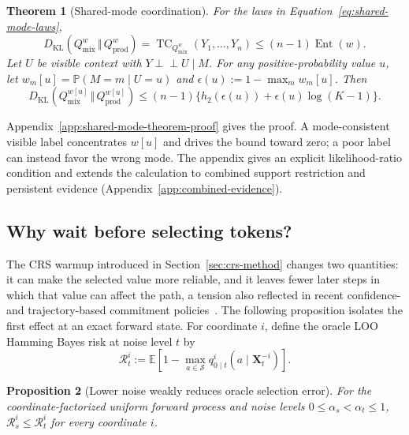 \documentclass{article}
\newcommand{\KL}{D_{\mathrm{KL}}}
\newcommand{\kldiv}{\,\Vert\,}
\newcommand{\TC}{\operatorname{TC}}
\newcommand{\Ent}{\operatorname{Ent}}
\newcommand{\1}{\mathbf 1}
\newtheorem{theorem}{Theorem}
\newtheorem{proposition}[theorem]{Proposition}
\theoremstyle{definition}
\begin{document}
\begin{theorem}[Shared-mode coordination]
\label{thm:shared-mode}
For the laws in Equation~\eqref{eq:shared-mode-laws},
\begin{equation}
 \KL(Q_{\mathrm{mix}}^w\kldiv Q_{\mathrm{prod}}^w)
 =\TC_{Q_{\mathrm{mix}}^w}(Y_1,\ldots,Y_n)
 \le(n-1)\Ent(w).
 \label{eq:shared-mode-gap}
\end{equation}
Let $U$ be visible context with $Y\perp\!\!\!\perp U\mid M$. For any
positive-probability value $u$, let $w_m[u]=\mathbb P(M=m\mid U=u)$ and
$\epsilon(u):=1-\max_m w_m[u]$. Then
\begin{equation}
 \KL(Q_{\mathrm{mix}}^{w[u]}\kldiv Q_{\mathrm{prod}}^{w[u]})
 \le(n-1)\{h_2(\epsilon(u))+\epsilon(u)\log(K-1)\}.
 \label{eq:context-mode-gap}
\end{equation}
\end{theorem}

Appendix~\ref{app:shared-mode-theorem-proof} gives the proof.
A mode-consistent visible label concentrates $w[u]$ and drives the bound
toward zero; a poor label can instead favor the wrong mode. The appendix gives
an explicit likelihood-ratio condition and extends the calculation to combined
support restriction and persistent evidence
(Appendix~\ref{app:combined-evidence}).

\subsection{Why wait before selecting tokens?}

The CRS warmup introduced in Section~\ref{sec:crs-method} changes two
quantities: it can make the selected value more reliable,
and it leaves fewer later steps in which that value can affect the path, a
tension also reflected in recent confidence- and trajectory-based commitment
policies~\citep{shu2026deferred,sun2026pathmatters}. The
following proposition isolates the first effect at an exact forward state. For
coordinate $i$, define the oracle LOO Hamming Bayes risk at noise level $t$ by
\begin{equation}
 \mathcal R_t^i
 :=\mathbb E\!\left[1-\max_{a\in\mathcal S}
 q_{0\mid t}^i(a\mid\bm X_t^{-i})\right].
 \label{eq:loo-warmup-risk}
\end{equation}

\begin{proposition}[Lower noise weakly reduces oracle selection error]
\label{prop:warmup-blackwell}
For the coordinate-factorized uniform forward process and noise levels
$0\le\alpha_s<\alpha_t\le1$,
$\mathcal R_s^i\le\mathcal R_t^i$ for every coordinate $i$.
\end{proposition}
\end{document}

